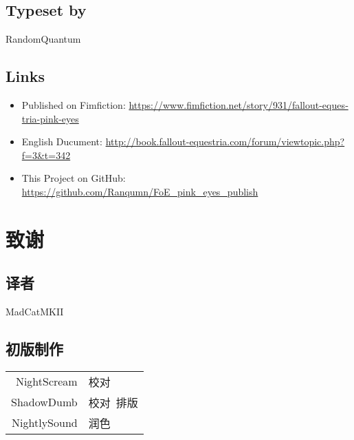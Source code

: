 \begin{english}
\section*{Typeset by}

\begin{center}
    RandomQuantum
\end{center}

\section*{Links}

\begin{itemize}
    \item Published on Fimfiction: \url{https://www.fimfiction.net/story/931/fallout-equestria-pink-eyes}
    \item English Ducument: \url{http://book.fallout-equestria.com/forum/viewtopic.php?f=3\&t=342}
    \item This Project on GitHub: \url{https://github.com/Ranqumn/FoE_pink_eyes_publish}
\end{itemize}


\end{english}


\chapter{致谢}

\pagestyle{chinese}

\section*{译者}

\begin{center}
    MadCatMKII
\end{center}

\section*{初版制作}

\begin{table}[H]
    \centering
    \begin{tabular}{rl}
        NightScream & 校对 \\
        ShadowDumb & 校对\ 排版 \\
        NightlySound & 润色 \\
    \end{tabular}
\end{table}

